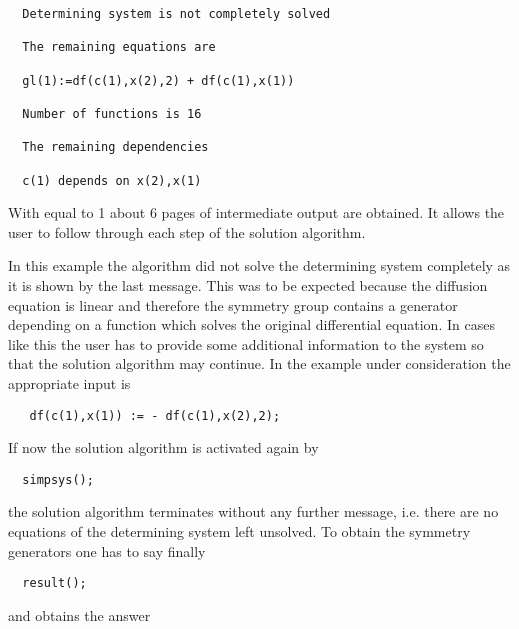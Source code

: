 \begin{verbatim}
  Determining system is not completely solved

  The remaining equations are

  gl(1):=df(c(1),x(2),2) + df(c(1),x(1))

  Number of functions is 16

  The remaining dependencies

  c(1) depends on x(2),x(1)
\end{verbatim}

With  equal to 1 about 6 pages of intermediate output are
obtained. It allows the user to follow through each step of the
solution algorithm.

In this example the algorithm did not solve the determining system
completely as it is shown by the last message. This was to be expected
because the diffusion equation is linear and therefore the symmetry
group contains a generator depending on a function which solves the
original differential equation. In cases like this the user has to
provide some additional information to the system so that the solution
algorithm may continue. In the example under consideration the
appropriate input is

\begin{verbatim}
   df(c(1),x(1)) := - df(c(1),x(2),2);
\end{verbatim}

If now the solution algorithm is activated again by

\begin{verbatim}
  simpsys();
\end{verbatim}

the solution algorithm terminates without any further message, i.e.
there are no equations of the determining system left unsolved. To
obtain the symmetry generators one has to say finally

\begin{verbatim}
  result();
\end{verbatim}

and obtains the answer

